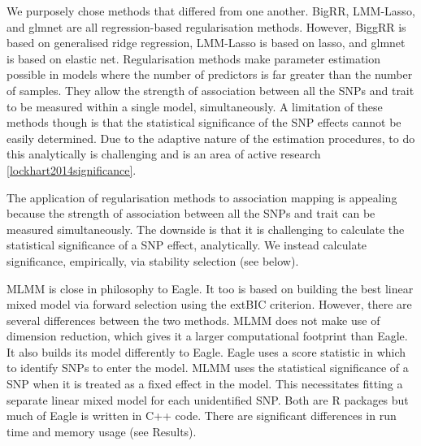 \documentclass{article}
\begin{document}
We purposely chose  methods that differed from one another. BigRR, LMM-Lasso, and glmnet are all regression-based regularisation 
methods. However, BiggRR is based on generalised ridge regression, LMM-Lasso is based on lasso, and glmnet is based on elastic net. 
Regularisation methods make parameter estimation possible in models  where the number of predictors is far greater than the number of samples. 
They allow the strength of association between all the SNPs and trait to be measured within a single model, simultaneously. 
A limitation of these methods though is that the statistical significance of the SNP effects cannot be easily determined. 
 Due to the adaptive nature of the estimation procedures, to do this 
analytically is challenging and is an area of active research \ref{lockhart2014significance}.



 
The application of regularisation methods to association mapping is appealing because the strength of association between all the SNPs and 
trait can be measured simultaneously. 
 The downside is that it is challenging to calculate  
the statistical significance of a SNP effect, analytically. We instead calculate significance, empirically, via stability selection (see below). 


MLMM is close in philosophy to Eagle. It too is based on  building the 
best  linear mixed model via forward selection using the extBIC criterion. 
However, there are several differences between the two methods.
 MLMM does not make use of dimension reduction, which gives it a larger  computational footprint than Eagle. 
  It also builds its model differently to Eagle. Eagle uses a score statistic in which to identify SNPs to enter the model. 
  MLMM uses the statistical significance of a SNP when it is treated as a fixed effect in the model. 
 This necessitates fitting a separate linear mixed model for each unidentified SNP. Both are R packages but much of Eagle is written in 
 C++ code. There are significant differences in run time and memory usage (see Results). 
 
\end{document}
